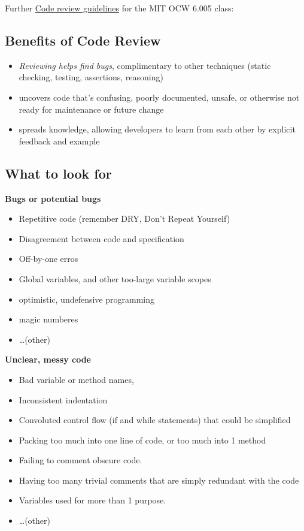 \documentclass[10pt]{amsart}
\begin{document}
Further \href{https://ocw.mit.edu/ans7870/6/6.005/s16/general/code-review.html}{Code review guidelines} for the MIT OCW 6.005 class:

\subsection{Benefits of Code Review}

\begin{itemize}
	\item \emph{Reviewing helps find bugs}, complimentary to other techniques (static checking, testing, assertions, reasoning)
	\item uncovers code that's confusing, poorly documented, unsafe, or otherwise not ready for maintenance or future change
	\item spreads knowledge, allowing developers to learn from each other by explicit feedback and example 
\end{itemize}

\subsection{What to look for}

\textbf{Bugs or potential bugs}
\begin{itemize}
	\item Repetitive code (remember DRY, Don't Repeat Yourself)
	\item Disagreement between code and specification
	\item Off-by-one erros
	\item Global variables, and other too-large variable scopes
	\item optimistic, undefensive programming
	\item magic numberes
	\item \dots (other)
\end{itemize}

\textbf{Unclear, messy code}
\begin{itemize}
	\item Bad variable or method names, 
	\item Inconsistent indentation
	\item Convoluted control flow (if and while statements) that could be simplified
	\item Packing too much into one line of code, or too much into 1 method
	\item Failing to comment obscure code.
	\item Having too many trivial comments that are simply redundant with the code
	\item Variables used for more than 1 purpose.
	\item \dots (other)
\end{itemize}
\end{document}
